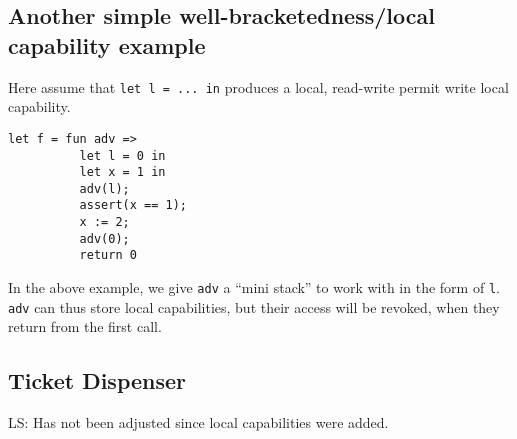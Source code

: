 \documentclass{article}
\newcommand\lau[1]{{\color{purple} \sf \footnotesize {LS: #1}}\\}
\newcommand{\var}[1]{\mathit{#1}}
\newcommand{\hs}{\var{hs}}
\newcommand{\codelabel}[1]{\mathit{#1}}
\newcommand{\malloc}{\codelabel{malloc}}
\begin{document}
\subsection{Another simple well-bracketedness/local capability example}
Here assume that \texttt{let l = ... in} produces a local, read-write permit write local capability.
\begin{verbatim}
let f = fun adv =>
          let l = 0 in
          let x = 1 in
          adv(l);
          assert(x == 1);
          x := 2;
          adv(0);
          return 0
\end{verbatim}
In the above example, we give \texttt{adv} a ``mini stack'' to work with in the form of \texttt{l}. \texttt{adv} can thus store local capabilities, but their access will be revoked, when they return from the first call.

\subsection{Ticket Dispenser}
\label{sec:tick-disp}
\newcommand{\hsfoot}{\hs_\var{footprint}}
\newcommand{\hsframe}{\hs_\var{frame}}
\newcommand{\size}{\var{size}}
\newcommand{\rio}{r_{io}}
\newcommand{\adv}{\codelabel{adv}}
\newcommand{\advb}{\var{adv_{base}}}
\newcommand{\adve}{\var{adv_{end}}}
\newcommand{\initb}{\var{init}_{base}}
\newcommand{\inite}{\var{init}_{end}}
\newcommand{\mrlen}{5cm}
\newcommand{\retm}{\var{ret}_{\malloc}}
\newcommand{\reta}{\var{ret}_{\adv}}
\newcommand{\base}{\var{base}}
\newcommand{\eend}{\var{end}}
\newcommand{\bracket}[1]{\multirow{#1}{*}{\ensuremath{
 \left . \vphantom{\begin{array}{l}
 \ifthenelse{\equal{#1}{1}}{3\\}{
    \ifthenelse{\equal{#1}{2}}{3\\3\\}{
    \ifthenelse{\equal{#1}{3}}{3\\3\\3\\}{
    \ifthenelse{\equal{#1}{4}}{3\\3\\3\\3\\}{
    \ifthenelse{\equal{#1}{5}}{3\\3\\3\\3\\3\\}{
    \ifthenelse{\equal{#1}{6}}{3\\3\\3\\3\\3\\3\\}{
      3\\3\\3\\3\\3\\3\\3\\ %
  }}}}}}
  \end{array}} \right \}}}
}
\newcommand{\annotate}[2]{\multirow{#1}{\mrlen}{\scriptsize #2}}
\lau{Has not been adjusted since local capabilities were added.}
\end{document}
